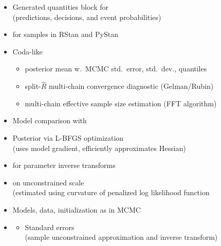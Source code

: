 \documentclass[10pt]{report}
\begin{document}
\begin{itemize}
\item Generated quantities block for 
  \\ {\footnotesize (predictions, decisions, and event probabilities)}
\item {} for samples in RStan and PyStan
\item Coda-like 
  \vspace*{-4pt}
  \begin{itemize}\small
  \item posterior mean w.\ MCMC std.\ error, std.\ dev., quantiles
  \item split-$\hat{R}$ multi-chain convergence diagnostic (Gelman/Rubin)
  \item multi-chain effective sample size estimation (FFT algorithm)
  \end{itemize}
\item Model comparison with 
\end{itemize}


\begin{itemize}
\item Posterior  via L-BFGS optimization
  \\ {\footnotesize (uses model gradient, efficiently approximates Hessian)}
\item {} for parameter inverse transforms
  \item  {} on unconstrained scale
    \\
    {\footnotesize  (estimated using curvature of penalized log likelihood function}
\item Models, data, initialization as in MCMC
  \vfill
\item {}
  \vspace*{-4pt}
  \begin{itemize}\small
  \item Standard errors 
    \\
    {\footnotesize  (sample unconstrained approximation and inverse transform)}
  \end{itemize}      
\end{itemize}
\end{document}
